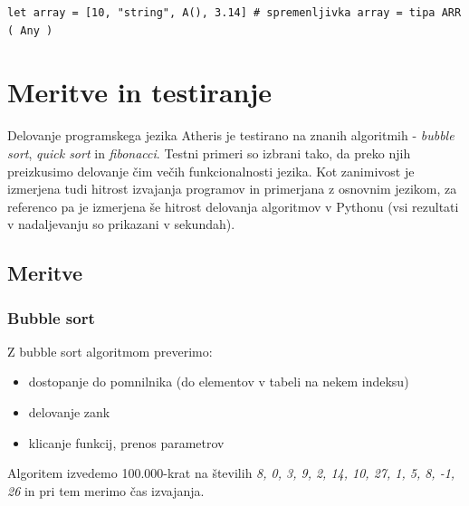 \documentclass[a4paper, 12p]{book}
\begin{document}
\begin{lstlisting}[caption={Elementi tabele nimajo skupnega tipa.}, captionpos=b]
	let array = [10, "string", A(), 3.14] # spremenljivka array = tipa ARR ( Any )
\end{lstlisting}

\chapter{Meritve in testiranje}

Delovanje programskega jezika Atheris je testirano na znanih algoritmih - \textit{bubble sort}, \textit{quick sort} in \textit{fibonacci}. Testni primeri so izbrani tako, da preko njih preizkusimo delovanje čim večih funkcionalnosti jezika. Kot zanimivost je izmerjena tudi hitrost izvajanja programov in primerjana z osnovnim jezikom, za referenco pa je izmerjena še hitrost delovanja algoritmov v Pythonu (vsi rezultati v nadaljevanju so prikazani v sekundah).

\section{Meritve}

\subsection{Bubble sort}

Z bubble sort algoritmom preverimo:
\vspace{-7mm}
\begin{itemize}
	\setlength\itemsep{-1em}
	\item dostopanje do pomnilnika (do elementov v tabeli na nekem indeksu)
	\item delovanje zank
	\item klicanje funkcij, prenos parametrov
\end{itemize}
\vspace{-5mm}
Algoritem izvedemo 100.000-krat na številih \textit{8, 0, 3, 9, 2, 14, 10, 27, 1, 5, 8, -1, 26} in pri tem merimo čas izvajanja.

\end{document}
